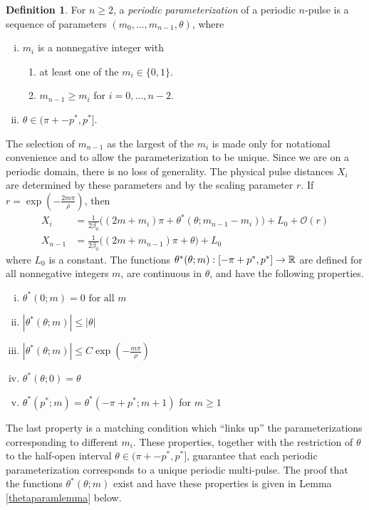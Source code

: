 \documentclass[10pt,reqno]{amsart}
\theoremstyle{plain}
\theoremstyle{definition}
\newtheorem{definition}[theorem]{Definition}
\theoremstyle{remark}
\numberwithin{theorem}{section}
\numberwithin{equation}{section}
\begin{document}
\begin{definition}\label{def:perparam}
For $n \geq 2$, a \emph{periodic parameterization} of a periodic $n$-pulse is a sequence of parameters $(m_0, \dots, m_{n-1}, \theta)$, where
\begin{enumerate}[(i)]
\item $m_i$ is a nonnegative integer with
\begin{enumerate}
\item at least one of the $m_i \in \{0, 1\}$.
\item $m_{n-1} \geq m_i$ for $i = 0, \dots, n-2$.
\end{enumerate}
\item $\theta \in (\pi + -p^*, p^*]$.
\end{enumerate}
\end{definition}
The selection of $m_{n-1}$ as the largest of the $m_i$ is made only for notational convenience and to allow the parameterization to be unique. Since we are on a periodic domain, there is no loss of generality. The physical pulse distances $X_i$ are determined by these parameters and by the scaling parameter $r$. If $r = \exp\left(-\frac{2 m \pi}{\rho}\right)$, then
\begin{align*}
X_i &= \frac{1}{2 \beta_0}\big( (2 m + m_i)\pi + \theta^*(\theta; m_{n-1} - m_i)\big) + L_0 + \mathcal{O}(r) \\
X_{n-1} &= \frac{1}{2 \beta_0}\big( (2 m + m_{n-1})\pi + \theta \big) + L_0
\end{align*}
where $L_0$ is a constant. The functions $\theta^*(\theta; m): [-\pi + p^*, p^*] \rightarrow \mathbb{R}$ are defined for all nonnegative integers $m$, are continuous in $\theta$, and have the following properties.
\begin{enumerate}[(i)]
\item $\theta^*(0; m) = 0 \text{ for all } m$
\item $|\theta^*(\theta; m)| \leq |\theta|$
\item $|\theta^*(\theta; m)| \leq C \exp\left(-\frac{m \pi}{\rho} \right)$
\item $\theta^*(\theta; 0) = \theta $
\item $\theta^*(p^*; m) = \theta^*(-\pi+p^*; m+1)$ for $m \geq 1$
\end{enumerate}
The last property is a matching condition which ``links up'' the parameterizations corresponding to different $m_i$. These properties, together with the restriction of $\theta$ to the half-open interval $\theta \in (\pi + -p^*, p^*]$, guarantee that each periodic parameterization corresponds to a unique periodic multi-pulse. The proof that the functions $\theta^*(\theta; m)$ exist and have these properties is given in Lemma \ref{thetaparamlemma} below.
\end{document}
